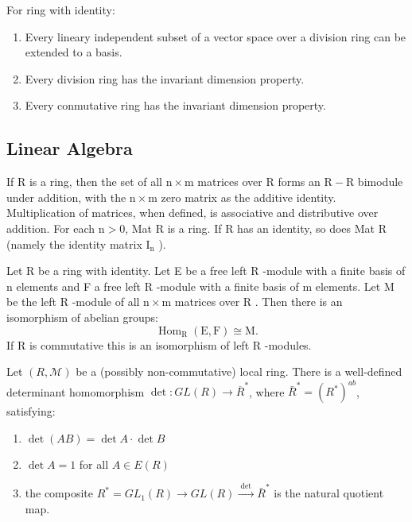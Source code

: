 \begin{theo} For ring with identity:
    \begin{enumerate}
        \item Every lineary independent subset of a vector space over a division ring can be extended to a basis.
        \item Every division ring has the invariant dimension property.
        \item Every conmutative ring has the invariant dimension property.
    \end{enumerate}
    \end{theo}

\subsection*{Linear Algebra}

If R is a ring, then the set of all $\mathrm{n} \times \mathrm{m}$ matrices over R forms an $\mathrm{R}-\mathrm{R}$ bimodule under addition, with the $\mathrm{n} \times \mathrm{m}$ zero matrix as the additive identity. Multiplication of matrices, when defined, is associative and distributive over addition. For each $\mathrm{n}>0$, Mat R is a ring. If R has an identity, so does Mat R (namely the identity matrix $\mathrm{I}_{\mathrm{n}}$ ).

\begin{theo}
Let R be a ring with identity. Let E be a free left R -module with a finite basis of n elements and F a free left R -module with a finite basis of m elements. Let M be the left R -module of all $\mathrm{n} \times \mathrm{m}$ matrices over R . Then there is an isomorphism of abelian groups:
$$
\operatorname{Hom}_{\mathrm{R}}(\mathrm{E}, \mathrm{F}) \cong \mathrm{M} .
$$
If R is commutative this is an isomorphism of left R -modules.
\end{theo}

\begin{theo}
Let $(R, \mathcal{M})$ be a (possibly non-commutative) local ring. There is a well-defined determinant homomorphism $\det: GL(R) \rightarrow \overline{R}^*$, where $\bar{R}^*=\left(R^*\right)^{a b}$, satisfying:

\begin{enumerate}
    \item $\operatorname{det}(A B)=\operatorname{det} A \cdot \operatorname{det} B$
    \item $\operatorname{det} A=1$ for all $A \in E(R)$
    \item the composite $R^*=G L_1(R) \longrightarrow G L(R) \xrightarrow{\text { det }} \bar{R}^*$ is the natural quotient map.
\end{enumerate}

\end{theo}



